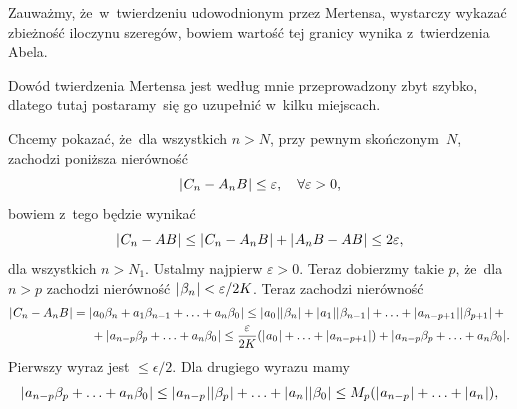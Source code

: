 \documentclass[a4paper,11pt]{article}
\numberwithin{equation}{section}
\begin{document}
\VerSpaceFour





\noindent
{} Zauważmy, że~w~twierdzeniu udowodnionym przez Mertensa, wystarczy
wykazać zbieżność iloczynu szeregów, bowiem wartość tej granicy wynika
z~twierdzenia Abela.

\VerSpaceFour





\noindent
{} Dowód twierdzenia Mertensa jest według mnie przeprowadzony zbyt
szybko, dlatego tutaj postaramy~się go uzupełnić w~kilku miejscach.

Chcemy pokazać, że~dla wszystkich $n > N$, przy pewnym skończonym~$N$,
zachodzi poniższa nierówność
\begin{equation}
  \label{eq:Leja-Funkcje-zespolone-14}
  | \hspace{0.05em}  C_{ n } - A_{ n } B  \hspace{0.05em} | \leq \varepsilon, \quad \forall \varepsilon > 0,
\end{equation}
bowiem z~tego będzie wynikać
\begin{equation}
  \label{eq:Leja-Funkcje-zespolone-15}
  | \hspace{0.05em}  C_{ n } - AB  \hspace{0.05em} | \leq
  | \hspace{0.05em}  C_{ n } - A_{ n } B  \hspace{0.05em} | + | \hspace{0.05em}  A_{ n } B - AB  \hspace{0.05em} | \leq 2 \varepsilon,
\end{equation}
dla wszystkich $n > N_{ 1 }$. Ustalmy najpierw $\varepsilon > 0$. Teraz
dobierzmy takie $p$, że~dla $n > p$ zachodzi nierówność
$| \hspace{0.05em}  \beta_{ n }  \hspace{0.05em} | < \varepsilon / 2K$. Teraz zachodzi nierówność
\begin{equation}
  \label{eq:Leja-Funkcje-zespolone-16}
  \begin{split}
    | \hspace{0.05em}  C_{ n } - A_{ n } B  \hspace{0.05em} |
    &=
      | \hspace{0.05em}  a_{ 0 } \beta_{ n } + a_{ 1 } \beta_{ n - 1 } + \ldots + a_{ n } \beta_{ 0 }  \hspace{0.05em} | \leq
      | \hspace{0.05em}  a_{ 0 }  \hspace{0.05em} | | \hspace{0.05em}  \beta_{ n }  \hspace{0.05em} |
      + | \hspace{0.05em}  a_{ 1 }  \hspace{0.05em} | | \hspace{0.05em}  \beta_{ n - 1 }  \hspace{0.05em} | + \ldots
      + | \hspace{0.05em}  a_{ n - p + 1 }  \hspace{0.05em} | | \hspace{0.05em}  \beta_{ p + 1 }  \hspace{0.05em} | \, + \\
    &\hspace{1.5em}
      + | \hspace{0.05em}  a_{ n - p } \beta_{ p } + \ldots + a_{ n } \beta_{ 0 }  \hspace{0.05em} | \leq
      \frac{ \varepsilon }{ 2K }
      ( | \hspace{0.05em}  a_{ 0 }  \hspace{0.05em} | + \ldots + | \hspace{0.05em}  a_{ n - p + 1 }  \hspace{0.05em} | )
      + | \hspace{0.05em}  a_{ n - p } \beta_{ p } + \ldots + a_{ n } \beta_{ 0 }  \hspace{0.05em} |.
  \end{split}
\end{equation}
Pierwszy wyraz jest $\leq \epsilon / 2$. Dla drugiego wyrazu mamy
\begin{equation}
  \label{eq:Leja-Funkcje-zespolone-17}
  | \hspace{0.05em}  a_{ n - p } \beta_{ p } + \ldots + a_{ n } \beta_{ 0 }  \hspace{0.05em} | \leq
  | \hspace{0.05em}  a_{ n - p }  \hspace{0.05em} | | \hspace{0.05em}  \beta_{ p }  \hspace{0.05em} | + \ldots + | \hspace{0.05em}  a_{ n }  \hspace{0.05em} |
  | \hspace{0.05em}  \beta_{ 0 }  \hspace{0.05em} | \leq
  M_{ p } ( | \hspace{0.05em}  a_{ n - p }  \hspace{0.05em} | + \ldots + | \hspace{0.05em}  a_{ n }  \hspace{0.05em} | ),
\end{equation}
\end{document}
